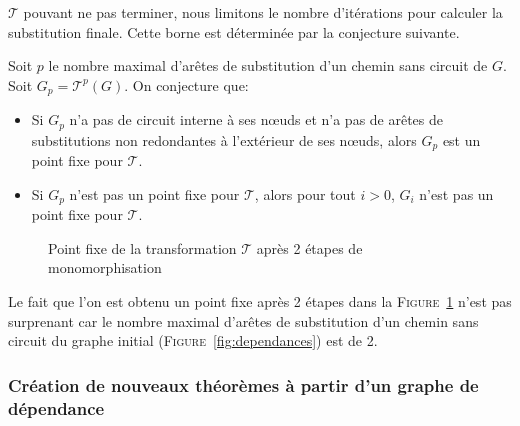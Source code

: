 $\mathcal{T}$ pouvant ne pas terminer, nous limitons le nombre
d'itérations pour calculer la substitution finale. Cette borne est
déterminée par la conjecture suivante.

\begin{conjecture}
Soit $p$ le nombre maximal d'arêtes de substitution d'un chemin sans circuit de $G$. \\Soit $G_p = \mathcal{T}^p(G)$. On conjecture que:
\begin{itemize}
\item Si $G_p$ n'a pas de circuit interne à ses nœuds et n'a pas de arêtes de substitutions non redondantes à l'extérieur de ses nœuds, alors $G_p$ est un point fixe pour $\mathcal{T}$.
\item Si $G_p$ n'est pas un point fixe pour $\mathcal{T}$, alors pour tout $i>0$, $G_i$ n'est pas un point fixe pour $\mathcal{T}$.
\end{itemize}
\end{conjecture}

\begin{figure}[h!]
\begin{center}
\end{center}
\caption{Point fixe de la transformation $\mathcal{T}$ après 2 étapes de monomorphisation}
\label{fig:point_fixe}
\end{figure}

\begin{remark}
Le fait que l'on est obtenu un point fixe après 2 étapes dans la \textsc{Figure}~\ref{fig:point_fixe} n'est pas surprenant car le nombre maximal d'arêtes de substitution d'un chemin sans circuit du graphe initial (\textsc{Figure}~\ref{fig:dependances}) est de 2.
\end{remark}

\subsubsection{Création de nouveaux théorèmes à partir d'un graphe de dépendance}
\label{sec:traduction:nouveautes:conclusion}


